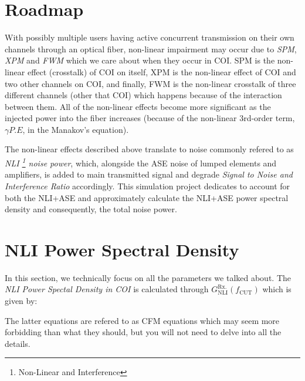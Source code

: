 \documentclass[10pt,letterpaper]{article}
\begin{document}
\section{Roadmap}
With possibly multiple users having active concurrent transmission on their own channels through an optical fiber, non-linear impairment may occur due to \textit{SPM}, \textit{XPM} and \textit{FWM} which we care about when they occur in COI. SPM is the non-linear effect (crosstalk) of COI on itself, XPM is the non-linear effect of COI and two other channels on COI, and finally, FWM is the non-linear crosstalk of three different channels (other that COI) which happens because of the interaction between them. All of the non-linear effects become more significant as the injected power into the fiber increases (because of the non-linear 3rd-order term, $\gamma P.E$, in the Manakov's equation).

The non-linear effects described above translate to noise commonly refered to as \textit{NLI
\footnote{
Non-Linear and Interference
}
 noise power}, which, alongside the ASE noise of lumped elements and amplifiers, is added to main transmitted signal and degrade \textit{Signal to Noise and Interference Ratio} accordingly. This simulation project dedicates to account for both the NLI+ASE and approximately calculate the NLI+ASE power spectral density and consequently, the total noise power.
\section{NLI Power Spectral Density}
In this section, we technically focus on all the parameters we talked about. The \textit{NLI Power Spectal Density in COI} is calculated through 
$
G_{\text{NLI}}^{\text{Rx.}}(f_{\text{CUT}})
$
which is given by:

The latter equations are refered to as CFM equations which may seem more forbidding than what they should, but you will not need to delve into all the details.
\end{document}
